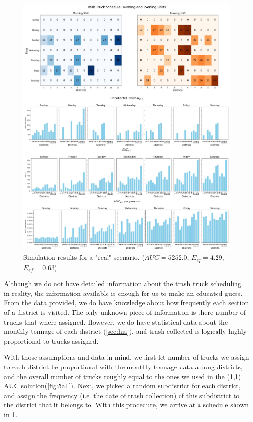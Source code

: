 \documentclass{article}
\begin{document}
\begin{figure}[H]
	\centering
	\includegraphics[width=1\textwidth]{figures/Real.jpg}
	\caption{Simulation results for a "real" scenario. ($AUC =  5252.0 $, $E_{eq}= 4.29 ,$ $E_{ef}= 0.63 $).}
	\label{fig:6all}
\end{figure}

Although we do not have detailed information about the trash truck scheduling in reality, the information available is enough for us to make an educated guess. From the data provided,  we do have knowledge about how frequently \cite{Freq} each section of a district is visited. The only unknown piece of information is there number of trucks that where assigned. However, we do have statistical data about the monthly tonnage of each district (\cref{sec:hia}), and trash collected is logically highly proportional to trucks assigned. 

With those assumptions and data in mind, we first let number of trucks we assign to each district be proportional with the monthly tonnage data among districts, and the overall number of trucks roughly equal to the ones we used in the (1,1) AUC solution(\cref{fig:5all}). Next, we picked a random subdistrict for each district, and assign the frequency (i.e. the date of trash collection) of this subdistrict to the district that it belongs to. With this procedure, we arrive at a schedule shown in \cref{fig:6all}.
\end{document}
